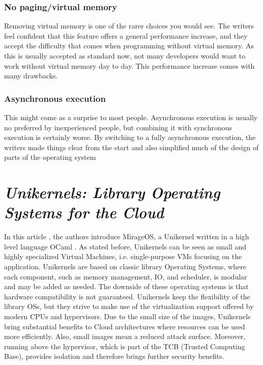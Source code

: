 \documentclass[12pt]{article}
\begin{document}
\subsubsection{No paging/virtual memory}
Removing virtual memory is one of the rarer choices you would see. The writers feel confident that this feature offers a general performance
increase, and they accept the difficulty that comes when programming without virtual memory. As this is usually accepted as standard now, not
many developers would want to work without virtual memory day to day. This performance increase comes with many drawbacks.

\subsubsection{Asynchronous execution}
This might come as a surprise to most people. Asynchronous execution is usually no preferred by inexperienced people, but combining it with
synchronous execution is certainly worse. By switching to a fully asynchronous execution, the writers made things clear from the start and
also simplified much of the design of parts of the operating system



\section{\emph{Unikernels: Library Operating Systems for the Cloud}}
In this article \cite{article2}, the authors introduce MirageOS, a Unikernel written in a high level language OCaml \cite{ocaml}.
As stated before, Unikernels can be seen as small and highly specialized Virtual Machines, i.e. single-purpose VMs focusing on the
application. Unikernels are based on classic library Operating Systems, where each component, such as memory management, IO, and scheduler,
is modular and may be added as needed. The downside of these operating systems is that hardware compatibility is not guaranteed. Unikernels
keep the flexibility of the library OSs, but they strive to make use of the virtualization support offered by modern CPUs and hypervisors.
Due to the small size of the images, Unikernels bring substantial benefits to Cloud architectures where resources can be used more efficiently.
Also, small images mean a reduced attack surface. Moreover, running above the hypervisor, which is part of the TCB (Trusted Computing Base),
provides isolation and therefore brings further security benefits.
\end{document}
